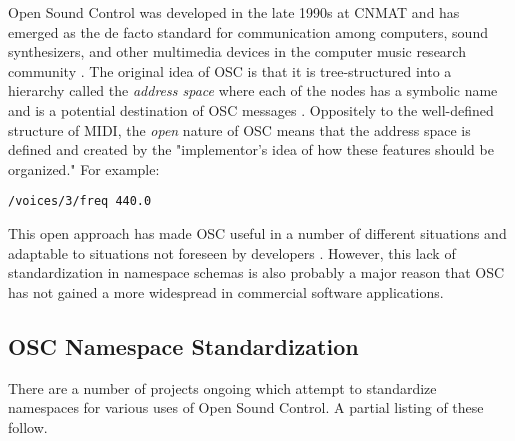 \documentclass{sig-alternate}
\begin{document}
Open Sound Control was developed in the late 1990s at CNMAT and has emerged as the de facto standard for communication among computers, sound synthesizers, and other multimedia devices in the computer music research community \cite{Wright:2003}. The original idea of OSC is that it is tree-structured into a hierarchy called the \emph{address space} where each of the nodes has a symbolic name and is a potential destination of OSC messages \cite{Wright:2003}. Oppositely to the well-defined structure of MIDI, the \emph{open} nature of OSC means that the address space is defined and created by the "implementor’s idea of how these features should be organized." For example:

\texttt{/voices/3/freq 440.0}

This open approach has made OSC useful in a number of different situations and adaptable to situations not foreseen by developers \cite{Wright:2005}.  However, this lack of standardization in namespace schemas is also probably a major reason that OSC has not gained a more widespread in commercial software applications.


\subsection{OSC Namespace Standardization}

There are a number of projects ongoing which attempt to standardize namespaces for various uses of Open Sound Control. A partial listing of these follow.\\
\end{document}
